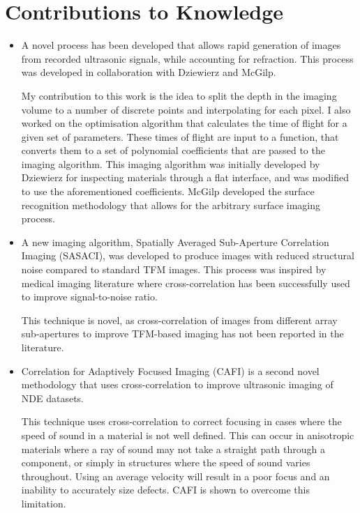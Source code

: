\section{Contributions to Knowledge}

\begin{itemize}
	\item A novel process has been developed that allows rapid generation of images from recorded ultrasonic signals, while accounting for refraction. This process was developed in collaboration with Dziewierz and McGilp.

	My contribution to this work is the idea to split the depth in the imaging volume to a number of discrete points and interpolating for each pixel. I also worked on the optimisation algorithm that calculates the time of flight for a given set of parameters. These times of flight are input to a function, that converts them to a set of polynomial coefficients that are passed to the imaging algorithm. This imaging algorithm was initially developed by Dziewierz for inspecting materials through a flat interface, and was modified to use the aforementioned coefficients. McGilp developed the surface recognition methodology that allows for the arbitrary surface imaging process.

	\item A new imaging algorithm, Spatially Averaged Sub-Aperture Correlation Imaging (SASACI), was developed to produce images with reduced structural noise compared to standard TFM images. This process was inspired by medical imaging literature where cross-correlation has been successfully used to improve signal-to-noise ratio.

	This technique is novel, as cross-correlation of images from different array sub-apertures to improve TFM-based imaging has not been reported in the literature.

	\item Correlation for Adaptively Focused Imaging (CAFI) is a second novel methodology that uses cross-correlation to improve ultrasonic imaging of NDE datasets.

	This technique uses cross-correlation to correct focusing in cases where the speed of sound in a material is not well defined. This can occur in anisotropic materials where a ray of sound may not take a straight path through a component, or simply in structures where the speed of sound varies throughout. Using an average velocity will result in a poor focus and an inability to accurately size defects. CAFI is shown to overcome this limitation.
\end{itemize}

